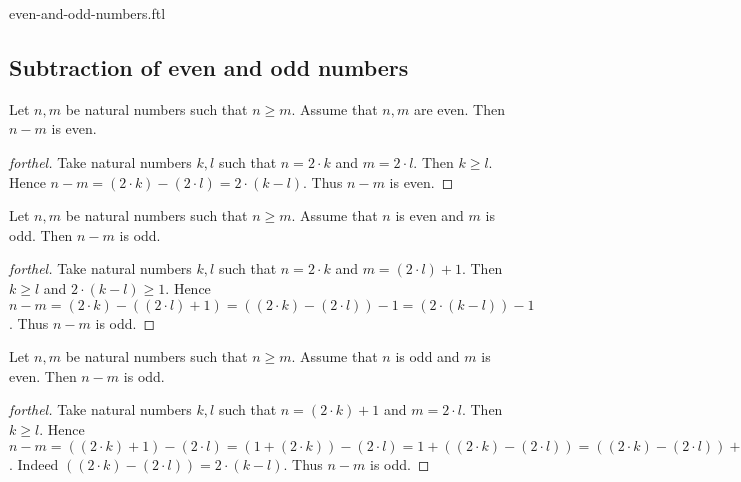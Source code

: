 \documentclass{naproche-library}
\begin{document}
\begin{smodule}{even-and-odd-numbers.ftl}
  \subsection{Subtraction of even and odd numbers}

  \begin{proposition}[forthel,id=ARITHMETIC_15_8748569852145203]
    Let $n, m$ be natural numbers such that $n \geq m$.
    Assume that $n, m$ are even.
    Then $n - m$ is even.
  \end{proposition}
  \begin{proof}[forthel]
    Take natural numbers $k, l$ such that $n = 2 \cdot k$ and $m = 2 \cdot l$.
    Then $k \geq l$.
    Hence $n - m
      = (2 \cdot k) - (2 \cdot l)
      = 2 \cdot (k - l)$.
    Thus $n - m$ is even.
  \end{proof}

  \begin{proposition}[forthel,id=ARITHMETIC_15_0125412036589958]
    Let $n, m$ be natural numbers such that $n \geq m$.
    Assume that $n$ is even and $m$ is odd.
    Then $n - m$ is odd.
  \end{proposition}
  \begin{proof}[forthel]
    Take natural numbers $k, l$ such that $n = 2 \cdot k$ and $m = (2 \cdot l) + 1$.
    Then $k \geq l$ and $2 \cdot (k - l) \geq 1$.
    Hence $n - m
      = (2 \cdot k) - ((2 \cdot l) + 1)
      = ((2 \cdot k) - (2 \cdot l)) - 1
      = (2 \cdot (k - l)) - 1$.
    Thus $n - m$ is odd.
  \end{proof}

  \begin{corollary}[forthel,id=ARITHMETIC_15_1021458745896523]
    Let $n, m$ be natural numbers such that $n \geq m$.
    Assume that $n$ is odd and $m$ is even.
    Then $n - m$ is odd.
  \end{corollary}
  \begin{proof}[forthel]
    Take natural numbers $k, l$ such that $n = (2 \cdot k) + 1$ and $m = 2 \cdot l$.
    Then $k \geq l$.
    Hence $n - m
      = ((2 \cdot k) + 1) - (2 \cdot l)
      = (1 + (2 \cdot k)) - (2 \cdot l)
      = 1 + ((2 \cdot k) - (2 \cdot l))
      = ((2 \cdot k) - (2 \cdot l)) + 1
      = (2 \cdot (k - l)) + 1$.
    Indeed $((2 \cdot k) - (2 \cdot l)) = 2 \cdot (k - l)$. %
    Thus $n - m$ is odd.
  \end{proof}


\end{smodule}
\end{document}
